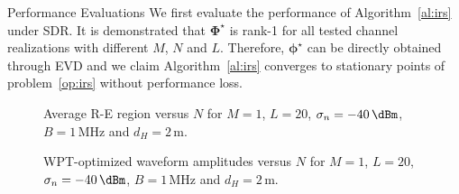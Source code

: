 \documentclass[journal]{IEEEtran}
\begin{document}
\begin{section}{Performance Evaluations}
		We first evaluate the performance of Algorithm~\ref{al:irs} under SDR. It is demonstrated that $\boldsymbol{\Phi}^{\star}$ is rank-\num{1} for all tested channel realizations with different $M$, $N$ and $L$. Therefore, $\boldsymbol{\phi}^{\star}$ can be directly obtained through EVD and we claim Algorithm~\ref{al:irs} converges to stationary points of problem~\ref{op:irs} without performance loss.

		\begin{figure}[!t]
			\centering
			\begin{adjustbox}{width=\linewidth}
				
			\end{adjustbox}
			\caption{Average R-E region versus $N$ for $M=1$, $L=20$, $\sigma_n=-40\,\si{\dBm}$, $B=1\,\si{\MHz}$ and $d_H=2\,\si{\meter}$.}
			\label{fi:re_subband}
		\end{figure}

		\begin{figure}[!t]
			\centering
			\begin{adjustbox}{width=\linewidth}
				
			\end{adjustbox}
			\caption{WPT-optimized waveform amplitudes versus $N$ for $M=1$, $L=20$, $\sigma_n=-40\,\si{\dBm}$, $B=1\,\si{\MHz}$ and $d_H=2\,\si{\meter}$.}
			\label{fi:waveform_subband}
		\end{figure}


\end{section}
\end{document}
